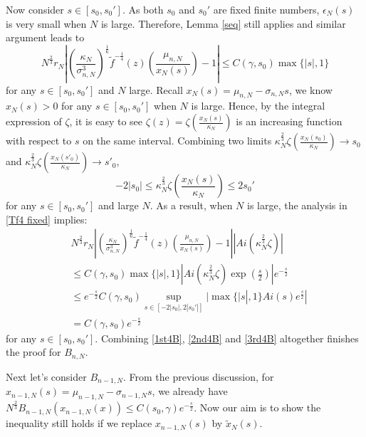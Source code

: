 \documentclass[11pt]{article}
\numberwithin{equation}{section}%
\numberwithin{theorem}{section}
\begin{document}
     Now consider $s\in[s_0,s_0']$. As both $s_0$ and $s_0'$ are fixed finite numbers, $\epsilon_N(s)$ is very small when $N$ is large. Therefore, Lemma \ref{seq} still applies and similar argument leads to
     \begin{equation}\label{Tf4 fixed}
          N^{\frac{2}{3}} r_N\left|\left(\frac{\kappa_N}{\sigma_{n,N}^3}\right)^{\frac{1}{6}}\tilde{f}^{-\frac{1}{4}}(z)
\left(\frac{\mu_{n,N}}{x_N(s)}\right)-1\right|\le C(\gamma,s_0)\max\{|s|,1\}
     \end{equation}
     for any $s\in[s_0,s_0']$ and $N$ large. Recall $x_N(s)=\mu_{n,N}-\sigma_{n,N}s$, we know $x_N(s)>0$ for any $s\in[s_0,s_0']$ when $N$ is large. Hence, by the integral expression of $\zeta$, it is easy to see $\zeta(z)=\zeta\left(\frac{x_N(s)}{\kappa_N}\right)$ is an increasing function with respect to $s$ on the same interval. Combining two limits $\kappa_N^\frac{2}{3}\zeta\left(\frac{x_N(s_0)}{\kappa_N}\right)\rightarrow s_0$ and $\kappa_N^\frac{2}{3}\zeta\left(\frac{x_N(s'_0)}{\kappa_N}\right)\rightarrow s'_0$,
     \begin{equation*}
         -2|s_0|\le\kappa_N^{\frac{2}{3}}\zeta\left(\frac{x_N(s)}{\kappa_N}\right)\le2s_0'
     \end{equation*}
     for any $s\in[s_0,s_0']$ and large $N$. As a result, when $N$ is large, the analysis in \eqref{Tf4 fixed} implies:
     \begin{equation}\label{3rd4B}
         \begin{split}
             &N^{\frac{2}{3}} r_N\left|\left(\frac{\kappa_N}{\sigma_{n,N}^3}\right)^{\frac{1}{6}}\tilde{f}^{-\frac{1}{4}}(z)
\left(\frac{\mu_{n,N}}{x_N(s)}\right)-1\right|\left|Ai\left(\kappa_N^\frac{2}{3}\zeta\right)\right|\\
&\le C(\gamma,s_0)\max\{|s|,1\}\left|Ai\left(\kappa_N^\frac{2}{3}\zeta\right)\exp\left(\frac{s}{2}\right)\right|e^{-\frac{s}{2}}\\
&\le e^{-\frac{s}{2}}C(\gamma,s_0)\sup_{s\in[-2|s_0|,2|s_0'|]}|\max\{|s|,1\}Ai(s)e^{\frac{s}{2}}|\\&=C(\gamma,s_0)e^{-\frac{s}{2}}
         \end{split}
     \end{equation}
     for any $s\in[s_0,s_0']$. Combining \eqref{1st4B}, \eqref{2nd4B} and \eqref{3rd4B} altogether finishes the proof for $B_{n,N}$. 

     Next let's consider $B_{n-1,N}$. From the previous discussion, for $x_{n-1,N}(s)=\mu_{n-1,N}-\sigma_{n-1,N}s$, we already have $N^\frac{2}{3}B_{n-1,N}(x_{n-1,N}(x))\le C(s_0,\gamma)e^{-\frac{s}{2}}$. Now our aim is to show the inequality still holds if we replace $x_{n-1,N}(s)$ by $\tilde{x}_N(s)$. 
     
\end{document}
